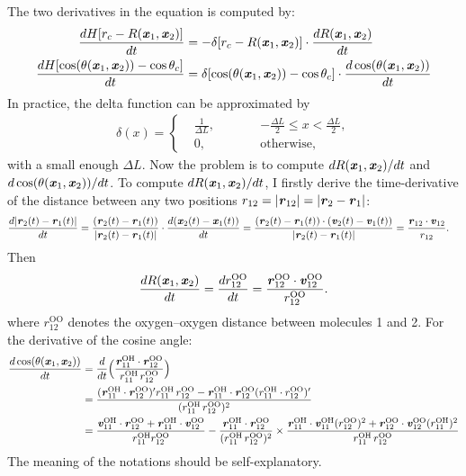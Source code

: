 \documentclass[unsortedaddress,a4paper,onecolumn]{revtex4}
\newcommand{\vect}[1]{\textbf{\textit{#1}}}
\newcommand{\oxy}[0]{{\textrm{O}}}
\newcommand{\hyd}[0]{{\textrm{H}}}
\begin{document}
The two derivatives in the equation is computed by:
\begin{align}
  \frac{dH [r_c - R(\vect x_1, \vect x_2)]}{dt}
  &=
  -\delta[r_c - R(\vect x_1, \vect x_2)]
  \cdot  \frac{dR(\vect x_1, \vect x_2)}{dt} \\
  \frac{dH[\cos(\theta(\vect x_1, \vect x_2)) - \cos \theta_c]}{dt}
  &=
  \delta[\cos(\theta(\vect x_1, \vect x_2)) - \cos \theta_c]
  \cdot \frac{d \cos(\theta(\vect x_1, \vect x_2))}{dt}
\end{align}
In practice, the delta function can be approximated by
\begin{align}
  \delta(x) =
  \left\{
    \begin{alignedat}{3}
      &\frac 1{\Delta L}, &\qquad& -\frac{\Delta L}{2} \leq x < \frac{\Delta L}{2}, \\
      & 0, &     & \textrm{otherwise},
    \end{alignedat}
  \right.
\end{align}
with a small enough $\Delta L$.
Now the problem is to compute $dR(\vect x_1, \vect x_2)/dt$ and $d
\cos(\theta(\vect x_1, \vect x_2))/dt$. To compute $dR(\vect x_1,
\vect x_2)/dt$, I firstly derive the time-derivative of the distance
between any two positions $r_{12} = \vert \vect r_{12}\vert  = \vert \vect r_2 - \vect r_1\vert$:
\begin{align} 
  \frac{d\vert \vect r_2(t) - \vect r_1(t)\vert}{dt}
  &=
  \frac{( \vect r_2(t) - \vect r_1(t) )}{  \vert \vect r_2(t) - \vect r_1(t)\vert} \cdot
  \frac{ d( \vect x_2(t) - \vect x_1(t) )}{dt}  
  =
  \frac{( \vect r_2(t) - \vect r_1(t) ) \cdot (\vect v_2(t) - \vect v_1(t))}{  \vert \vect r_2(t) - \vect r_1(t)\vert} 
  =
  \frac{\vect r_{12}\cdot \vect v_{12}}{r_{12}}.
\end{align}
Then
\begin{align}
  \frac{dR(\vect x_1, \vect x_2)}{dt} = \frac{d r^{\oxy\oxy}_{12}}{dt} = \frac{\vect r^{\oxy\oxy}_{12}\cdot \vect v^{\oxy\oxy}_{12}}{r^{\oxy\oxy}_{12}}.
\end{align}
where $r_{12}^{\oxy\oxy}$ denotes the oxygen--oxygen distance between molecules 1 and 2. For the derivative of the cosine angle:
\begin{align}\nonumber
  \frac{d \cos(\theta(\vect x_1, \vect x_2))}{dt}
  &=
  \frac{d}{dt}
  \Big (
  \frac{\vect r_{11}^{\oxy\hyd}\cdot \vect r_{12}^{\oxy\oxy}}{r_{11}^{\oxy\hyd} \, r_{12}^{\oxy\oxy}}
  \Big ) \\\nonumber
  &=
  \frac{(\vect r_{11}^{\oxy\hyd}\cdot \vect r_{12}^{\oxy\oxy})'r_{11}^{\oxy\hyd}\, r_{12}^{\oxy\oxy} - \vect r_{11}^{\oxy\hyd}\cdot \vect r_{12}^{\oxy\oxy} (r_{11}^{\oxy\hyd}\cdot r_{12}^{\oxy\oxy})'}{ ( r_{11}^{\oxy\hyd}\, r_{12}^{\oxy\oxy} )^2} \\
  & =
  \frac{\vect v_{11}^{\oxy\hyd}\cdot \vect r_{12}^{\oxy\oxy}  + \vect r_{11}^{\oxy\hyd}\cdot \vect v_{12}^{\oxy\oxy}}{ r_{11}^{\oxy\hyd}r_{12}^{\oxy\oxy}}
  -
  \frac{\vect r_{11}^{\oxy\hyd}\cdot \vect r_{12}^{\oxy\oxy} } { ( r_{11}^{\oxy\hyd}\, r_{12}^{\oxy\oxy} )^2 } \times
  \frac{ \vect r_{11}^{\oxy\hyd}\cdot \vect v_{11}^{\oxy\hyd} (r_{12}^{\oxy\oxy})^2 + \vect r_{12}^{\oxy\oxy}\cdot \vect v_{12}^{\oxy\oxy} (r_{11}^{\oxy\hyd})^2  }{ r_{11}^{\oxy\hyd}\, r_{12}^{\oxy\oxy} }
\end{align}
The meaning of the notations should be self-explanatory.

{}

\end{document}
